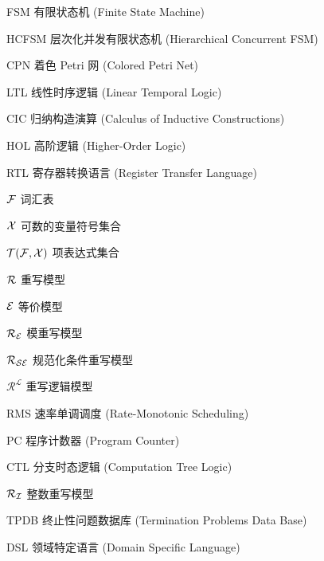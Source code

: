 \begin{denotation}[3cm]
\item[FSM] 有限状态机 (Finite State Machine)
\item[HCFSM] 层次化并发有限状态机 (Hierarchical Concurrent FSM)
\item[CPN] 着色 Petri 网 (Colored Petri Net)
\item[LTL] 线性时序逻辑 (Linear Temporal Logic)
\item[CIC] 归纳构造演算 (Calculus of Inductive Constructions)
\item[HOL] 高阶逻辑 (Higher-Order Logic)
\item[RTL] 寄存器转换语言 (Register Transfer Language)
\item[$\mathcal{F}$] 词汇表
\item[$\mathcal{X}$] 可数的变量符号集合
\item[$\mathcal{T}(\mathcal{F},\mathcal{X})$] 项表达式集合
\item[$\mathcal{R}$] 重写模型
\item[$\mathcal{E}$] 等价模型
\item[$\mathcal{R}_{\mathcal{E}}$] 模重写模型
\item[$\mathcal{R}_{\mathcal{S}\mathcal{E}}$] 规范化条件重写模型
\item[$\mathcal{R^L}$] 重写逻辑模型
\item[RMS] 速率单调调度 (Rate-Monotonic Scheduling)
\item[PC] 程序计数器 (Program Counter)
\item[CTL] 分支时态逻辑 (Computation Tree Logic)
\item[$\mathcal{R}_{\mathcal{I}}$] 整数重写模型
\item[TPDB] 终止性问题数据库 (Termination Problems Data Base)
\item[DSL] 领域特定语言 (Domain Specific Language)
\end{denotation}

